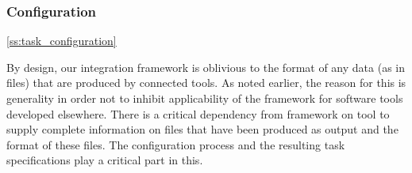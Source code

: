 \documentclass{article}
\begin{document}

  \subsubsection{Configuration} \label{ss:implementation_configuration}

   \ref{ss:task_configuration}


   By design, our integration framework is oblivious to the format of any data
   (as in files) that are produced by connected tools. As noted earlier, the
   reason for this is generality in order not to inhibit applicability of the
   framework for software tools developed elsewhere. There is a critical
   dependency from framework on tool to supply complete information on files
   that have been produced as output and the format of these files. The
   configuration process and the resulting task specifications play a critical
   part in this.
\end{document}
